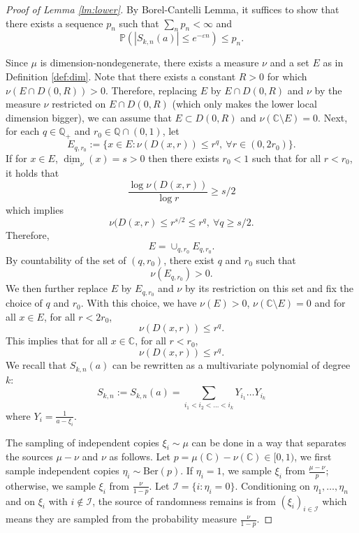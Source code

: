\documentclass[12pt, reqno]{amsart}
\theoremstyle{plain}
\theoremstyle{definition}
\newcommand\C{{\mathbb{C}}}
\renewcommand\P{{\mathbb{P}}}
\newcommand{\ep}{\varepsilon}
\begin{document}
 \begin{proof}[Proof of Lemma \ref{lm:lower}] By Borel-Cantelli Lemma, it suffices to show that there exists a sequence $p_n$ such that $\sum_n p_n<\infty$ and 
 	\begin{equation}\label{eq:smallball}
 		\P( |S_{k, n}(a)| \le  e^{-\ep n})\le p_n.
 	\end{equation}
 	
 	Since $\mu$ is dimension-nondegenerate, there exists a measure $\nu$ and a set $E$ as in Definition \ref{def:dim}. Note that there exists a constant $R>0$ for which $\nu(E\cap D(0, R))>0$. Therefore, replacing $E$ by $E\cap D(0, R)$ and $\nu$ by the measure $\nu$ restricted on $E\cap D(0, R)$ (which only makes the lower local dimension bigger), we can assume that $E\subset D(0, R)$ and $\nu(\C\setminus E) = 0$. Next, for each $q\in \mathbb Q_+$ and $r_0\in \mathbb Q\cap (0, 1)$, let
 	$$E_{q, r_0}:= \{x\in E: \nu(D(x, r))\le r^{q}, \ \forall r\in (0, 2r_0)\}.$$
 	If for $x\in E$, $\underline{\dim}_{\nu}(x)=s>0$ then  there exists $r_0<1$ such that for all $r < r_0$, it holds that
 	$$ \frac{\log \nu(D(x,r))}{\log r} \ge s/2$$
 	which implies 
 	$$  \nu(D(x,r) \le r^{s/2}\le r^q, \ \forall q\ge s/2.$$
 	Therefore, $$E  =\cup_{q, r_0} E_{q, r_0}.$$
 	By countability of the set of $(q, r_0)$, there exist $q$ and $r_0$ such that
 	$$\nu(E_{q, r_0})>0.$$
 	We then further replace $E$ by $E_{q, r_0}$ and $\nu$ by its restriction on this set and fix the choice of $q$ and $r_0$. With this choice, we have $\nu(E)>0$, $\nu(\C\setminus E) = 0$ and for all $x\in E$, for all $r<2r_0$, 
 	$$ \nu(D(x, r))\le r^{q}.$$
 	This implies that for all $x\in \C$, for all $r<r_0$,
 	 \begin{equation}
 	 	 \nu(D(x, r))\le r^{q}. \label{eq:xr}
 	 \end{equation}
 	We recall that $S_{k, n}(a)$ can be rewritten as a multivariate polynomial of degree $k$:
 	$$S_{k, n}:=S_{k, n}(a)= \sum_{i_1<i_2<\dots<i_k} Y_{i_1}\dots Y_{i_k}$$
 	where $Y_i = \frac{1}{a-\xi_i}$.
 	
 	The sampling of independent copies $\xi_i\sim \mu$ can be done in a way that separates the sources $\mu - \nu$ and $\nu$ as follows. Let $p = \mu(\C) - \nu(\C)\in [0, 1)$, we first sample independent copies $\eta_i\sim \text{Ber}(p)$. If $\eta_i=1$, we sample $\xi_i$ from $\frac{\mu-\nu}{p}$; otherwise, we sample $\xi_i$ from $\frac{\nu}{1-  p}$. Let $\mathcal I = \{i: \eta_i = 0\}$. Conditioning on $\eta_1, \dots, \eta_n$ and on $\xi_i$ with $i\notin \mathcal I$, the source of randomness remains is from $(\xi_i)_{i\in \mathcal I}$ which means they are sampled from the probability measure $\frac{\nu}{1-  p}$. 
 	

\end{proof}
\end{document}
